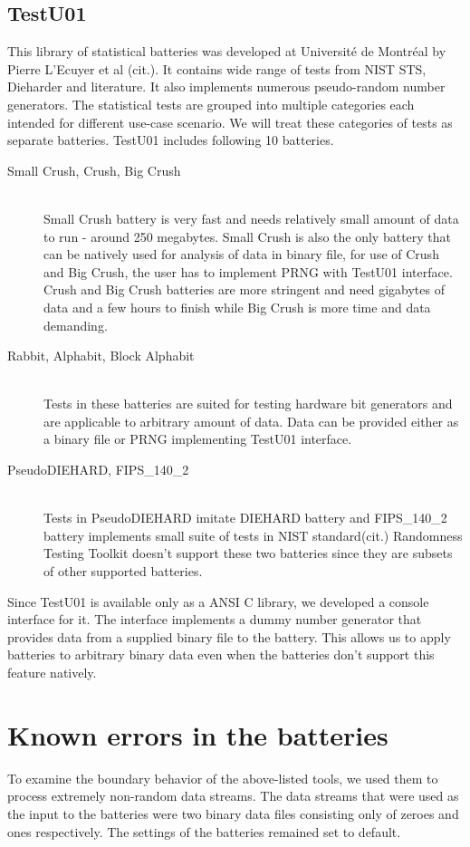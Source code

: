 \documentclass[
  digital,  	%
  color,		%
  oneside,   	%
  12pt,
  nocover,
  notable,
  nolof,
  nolot,
]{fithesis3}
\begin{document}
\subsection{TestU01}
This library of statistical batteries was developed at Université de Montréal by Pierre L’Ecuyer et al (cit.). It contains wide range of tests from NIST STS, Dieharder and literature. It also implements numerous pseudo-random number generators. The statistical tests are grouped into multiple categories each intended for different use-case scenario. We will treat these categories of tests as separate batteries. TestU01 includes following 10 batteries.
\begin{description}
\item[Small Crush, Crush, Big Crush] \hfill \\
Small Crush battery is very fast and needs relatively small amount of data to run - around 250 megabytes. Small Crush is also the only battery that can be natively used for analysis of data in binary file, for use of Crush and Big Crush, the user has to implement PRNG with TestU01 interface. Crush and Big Crush batteries are more stringent and need gigabytes of data and a few hours to finish while Big Crush is more time and data demanding.
\item[Rabbit, Alphabit, Block Alphabit] \hfill \\
Tests in these batteries are suited for testing hardware bit generators and are applicable to arbitrary amount of data. Data can be provided either as a binary file or PRNG implementing TestU01 interface.
\item[PseudoDIEHARD, FIPS\_140\_2] \hfill \\
Tests in PseudoDIEHARD imitate DIEHARD battery and FIPS\_140\_2 battery implements small suite of tests in NIST standard(cit.) Randomness Testing Toolkit doesn't support these two batteries since they are subsets of other supported batteries.
\end{description}

Since TestU01 is available only as a ANSI C library, we developed a console interface for it. The interface implements a dummy number generator that provides data from a supplied binary file to the battery. This allows us to apply batteries to arbitrary binary data even when the batteries don't support this feature natively.

\section{Known errors in the batteries}
To examine the boundary behavior of the above-listed tools, we used them to process extremely non-random data streams. The data streams that were used as the input to the batteries were two binary data files consisting only of zeroes and ones respectively. The settings of the batteries remained set to default. 
\end{document}
